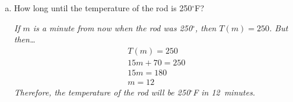 \documentclass[12pt,letterpaper]{exam}
\begin{document}
\begin{questions}
\begin{enumerate}[(a)]
	\item How long until the temperature of the rod is 250$^\circ$F? \pvspace{1cm}
	
	{\itshape If $m$ is a minute from now when the rod was 250$^\circ$, then $T(m)= 250$. But then\dots
		\[
		\begin{gathered}
		T(m)= 250 \\
		15m + 70= 250 \\
		15m= 180 \\
		m= 12
		\end{gathered}
		\]
	Therefore, the temperature of the rod will be 250$^\circ$F in 12~minutes. 
	}
	\end{enumerate}

\end{questions}
\end{document}
